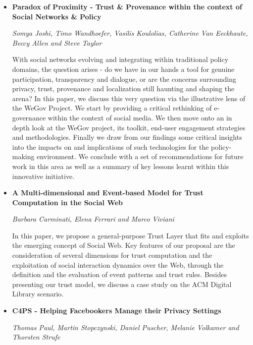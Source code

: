 \documentclass[a4paper,12pt,svgnames]{report}
\begin{document}
\begin{itemize}
\item \textbf{Paradox of Proximity - Trust \& Provenance within the context of
Social Networks \& Policy}

\textit{Somya Joshi, Timo Wandhoefer, Vasilis Koulolias, Catherine Van
Eeckhaute, Beccy Allen and Steve Taylor}

With social networks evolving and integrating within traditional policy domains,
the question arises - do we have in our hands a tool for genuine participation,
transparency and dialogue, or are the concerns surrounding privacy, trust,
provenance and localization still haunting and shaping the arena? In this paper,
we discuss this very question via the illustrative lens of the WeGov Project. We
start by providing a critical rethinking of e-governance within the context of
social media. We then move onto an in depth look at the WeGov project, its
toolkit, end-user engagement strategies and methodologies. Finally we draw from
our findings some critical insights into the impacts on and implications of such
technologies for the policy-making environment. We conclude with a set of
recommendations for future work in this area as well as a summary of key lessons
learnt within this innovative initiative.

\item \textbf{A Multi-dimensional and Event-based Model for Trust Computation in
the Social Web}

\textit{Barbara Carminati, Elena Ferrari and Marco Viviani}

In this paper, we propose a general-purpose Trust Layer that fits and exploits
the emerging concept of Social Web. Key features of our proposal are the
consideration of several dimensions for trust computation and the exploitation
of social interaction dynamics over the Web, through the definition and the
evaluation of event patterns and trust rules. Besides presenting our trust
model, we discuss a case study on the ACM Digital Library scenario.

\item \textbf{C4PS - Helping Facebookers Manage their Privacy Settings}

\textit{Thomas Paul, Martin Stopczynski, Daniel Puscher, Melanie Volkamer and
Thorsten Strufe} 


\end{itemize}
\end{document}
